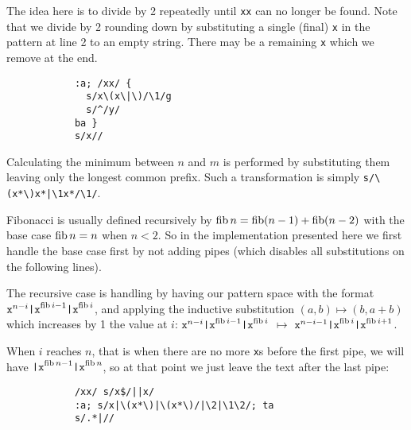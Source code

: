 \begin{description}
	\item[Logarithm: $x^n\mapsto y^{\lfloor\log_2 n\rfloor}$:]

		The idea here is to divide by 2 repeatedly until {\tt xx} can no longer
		be found.  Note that we divide by 2 rounding down by substituting a
		single (final) {\tt x} in the pattern at line 2 to an empty string.
		There may be a remaining {\tt x} which we remove at the end.

		\begin{Verbatim}
			:a; /xx/ {
			  s/x\(x\|\)/\1/g
			  s/^/y/
			ba }
			s/x//
		\end{Verbatim}

	\item[Minimum: $\texttt{x}^n\texttt{|x}^m \mapsto
		\texttt{x}^{\min\{n,m\}}$:]

		Calculating the minimum between $n$ and $m$ is performed by
		substituting them leaving only the longest common prefix.  Such a
		transformation is simply \verb!s/\(x*\)x*|\1x*/\1/!.

	\item{}

	\item[Fibonacci: $\texttt{x}^n\mapsto \texttt{x}^{\fib n}$:]

		Fibonacci is usually defined recursively by $\mathop{\mathrm{fib}} n = \mathop{\mathrm{fib}} (n-1) +
		\mathop{\mathrm{fib}} (n-2)$ with the base case $\mathop{\mathrm{fib}} n = n$ when $n<2$.  So in the
		implementation presented here we first handle the base case first by
		not adding pipes (which disables all substitutions on the following
		lines).

		The recursive case is handling by having our pattern space with the
		format $\texttt{x}^{n-i}\texttt{|x}^{\mathop{\mathrm{fib}} i-1}\texttt{|x}^{\mathop{\mathrm{fib}} i}$,
		and applying the inductive substitution $(a,b)\mapsto (b,a+b)$
		which increases by 1 the value at $i$:
		$\texttt{x}^{n-i}\texttt{|x}^{\mathop{\mathrm{fib}} i-1}\texttt{|x}^{\mathop{\mathrm{fib}} i}$
		$\mapsto$
		$\texttt{x}^{n-i-1}\texttt{|x}^{\mathop{\mathrm{fib}} i}\texttt{|x}^{\mathop{\mathrm{fib}} i+1}$.

		When $i$ reaches $n$, that is when there are no more {\tt x}s before
		the first pipe, we will have $\texttt{|x}^{\mathop{\mathrm{fib}} n-1}\texttt{|x}^{\mathop{\mathrm{fib}} n}$,
		so at that point we just leave the text after the last pipe:

		\begin{Verbatim}
			/xx/ s/x$/||x/
			:a; s/x|\(x*\)|\(x*\)/|\2|\1\2/; ta
			s/.*|//
		\end{Verbatim}

\end{description}

